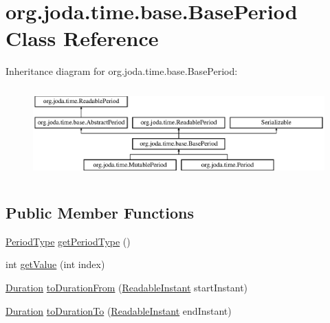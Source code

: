 \hypertarget{classorg_1_1joda_1_1time_1_1base_1_1_base_period}{\section{org.\-joda.\-time.\-base.\-Base\-Period Class Reference}
\label{classorg_1_1joda_1_1time_1_1base_1_1_base_period}
}
Inheritance diagram for org.\-joda.\-time.\-base.\-Base\-Period\-:\begin{figure}[H]
\begin{center}
\leavevmode
\includegraphics[height=3.522013cm]{classorg_1_1joda_1_1time_1_1base_1_1_base_period}
\end{center}
\end{figure}
\subsection*{Public Member Functions}
\begin{DoxyCompactItemize}
\item 
\hyperlink{classorg_1_1joda_1_1time_1_1_period_type}{Period\-Type} \hyperlink{classorg_1_1joda_1_1time_1_1base_1_1_base_period_a2bc1681c1753880e6dc84d37781d5b7a}{get\-Period\-Type} ()
\item 
int \hyperlink{classorg_1_1joda_1_1time_1_1base_1_1_base_period_a1852a6a8338454b9e40f91fb841661fd}{get\-Value} (int index)
\item 
\hyperlink{classorg_1_1joda_1_1time_1_1_duration}{Duration} \hyperlink{classorg_1_1joda_1_1time_1_1base_1_1_base_period_a9cd7f7257e01fa55ee53f8d23357b769}{to\-Duration\-From} (\hyperlink{interfaceorg_1_1joda_1_1time_1_1_readable_instant}{Readable\-Instant} start\-Instant)
\item 
\hyperlink{classorg_1_1joda_1_1time_1_1_duration}{Duration} \hyperlink{classorg_1_1joda_1_1time_1_1base_1_1_base_period_a2ea568de1cb5c07d0ffa80a6b3aa86c8}{to\-Duration\-To} (\hyperlink{interfaceorg_1_1joda_1_1time_1_1_readable_instant}{Readable\-Instant} end\-Instant)
\end{DoxyCompactItemize}
